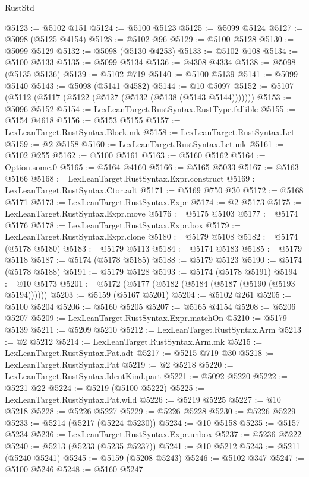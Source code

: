 \begin{lexlean}{RustStd}
\begin{coremodule}
@5123 := @5102 @151
@5124 := @5100 @5123
@5125 := @5099 @5124
@5127 := @5098 (@5125 @4154)
@5128 := @5102 @96
@5129 := @5100 @5128
@5130 := @5099 @5129
@5132 := @5098 (@5130 @4253)
@5133 := @5102 @108
@5134 := @5100 @5133
@5135 := @5099 @5134
@5136 := @4308 @4334
@5138 := @5098 (@5135 @5136)
@5139 := @5102 @719
@5140 := @5100 @5139
@5141 := @5099 @5140
@5143 := @5098 (@5141 @4582)
@5144 := @10 @5097
@5152 := @5107 (@5112 (@5117 (@5122 (@5127 (@5132 (@5138 (@5143 @5144)))))))
@5153 := @5096 @5152
@5154 := LexLeanTarget.RustSyntax.RustType.fallible
@5155 := @5154 @4618
@5156 := @5153 @5155
@5157 := LexLeanTarget.RustSyntax.Block.mk
@5158 := LexLeanTarget.RustSyntax.Let
@5159 := @2 @5158
@5160 := LexLeanTarget.RustSyntax.Let.mk
@5161 := @5102 @255
@5162 := @5100 @5161
@5163 := @5160 @5162
@5164 := Option.some.{0}
@5165 := @5164 @4160
@5166 := @5165 @5033
@5167 := @5163 @5166
@5168 := LexLeanTarget.RustSyntax.Expr.construct
@5169 := LexLeanTarget.RustSyntax.Ctor.adt
@5171 := @5169 @750 @30
@5172 := @5168 @5171
@5173 := LexLeanTarget.RustSyntax.Expr
@5174 := @2 @5173
@5175 := LexLeanTarget.RustSyntax.Expr.move
@5176 := @5175 @5103
@5177 := @5174 @5176
@5178 := LexLeanTarget.RustSyntax.Expr.box
@5179 := LexLeanTarget.RustSyntax.Expr.clone
@5180 := @5179 @5108
@5182 := @5174 (@5178 @5180)
@5183 := @5179 @5113
@5184 := @5174 @5183
@5185 := @5179 @5118
@5187 := @5174 (@5178 @5185)
@5188 := @5179 @5123
@5190 := @5174 (@5178 @5188)
@5191 := @5179 @5128
@5193 := @5174 (@5178 @5191)
@5194 := @10 @5173
@5201 := @5172 (@5177 (@5182 (@5184 (@5187 (@5190 (@5193 @5194))))))
@5203 := @5159 (@5167 @5201)
@5204 := @5102 @261
@5205 := @5100 @5204
@5206 := @5160 @5205
@5207 := @5165 @4154
@5208 := @5206 @5207
@5209 := LexLeanTarget.RustSyntax.Expr.matchOn
@5210 := @5179 @5139
@5211 := @5209 @5210
@5212 := LexLeanTarget.RustSyntax.Arm
@5213 := @2 @5212
@5214 := LexLeanTarget.RustSyntax.Arm.mk
@5215 := LexLeanTarget.RustSyntax.Pat.adt
@5217 := @5215 @719 @30
@5218 := LexLeanTarget.RustSyntax.Pat
@5219 := @2 @5218
@5220 := LexLeanTarget.RustSyntax.IdentKind.part
@5221 := @5092 @5220
@5222 := @5221 @22
@5224 := @5219 (@5100 @5222)
@5225 := LexLeanTarget.RustSyntax.Pat.wild
@5226 := @5219 @5225
@5227 := @10 @5218
@5228 := @5226 @5227
@5229 := @5226 @5228
@5230 := @5226 @5229
@5233 := @5214 (@5217 (@5224 @5230))
@5234 := @10 @5158
@5235 := @5157 @5234
@5236 := LexLeanTarget.RustSyntax.Expr.unbox
@5237 := @5236 @5222
@5240 := @5213 (@5233 (@5235 @5237))
@5241 := @10 @5212
@5243 := @5211 (@5240 @5241)
@5245 := @5159 (@5208 @5243)
@5246 := @5102 @347
@5247 := @5100 @5246
@5248 := @5160 @5247

\end{coremodule}
\end{lexlean}
